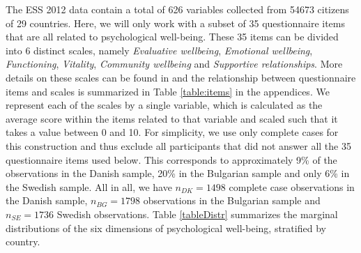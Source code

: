 \documentclass[titlepage,11pt,twoside]{article}
\begin{document}
The ESS 2012 data contain a total of 626 variables collected from 54673 citizens of 29 countries. Here, we will only work with a subset of 35 questionnaire items that are all related to psychological well-being. These 35 items can be divided into 6 distinct scales, namely \textit{Evaluative wellbeing}, \textit{Emotional wellbeing}, \textit{Functioning}, \textit{Vitality}, \textit{Community wellbeing} and \textit{Supportive relationships}. More details on these scales can be found in \citep{ESStopline5} and the relationship between questionnaire items and scales is summarized in Table \ref{table:items} in the appendices. We represent each of the scales by a single variable, which is calculated as the average score within the items related to that variable and scaled such that it takes a value between 0 and 10. For simplicity, we use only complete cases for this construction and thus exclude all participants that did not answer all the 35 questionnaire items used below. This corresponds to approximately 9\% of the observations in the Danish sample, 20\% in the Bulgarian sample and only 6\% in the Swedish sample. All in all, we have $n_{DK} = 1498$ complete case observations in the Danish sample, $n_{BG} = 1798$ observations in the Bulgarian sample and $n_{SE} = 1736$ Swedish observations. Table \ref{tableDistr} summarizes the marginal distributions of the six dimensions of psychological well-being, stratified by country.
\end{document}

